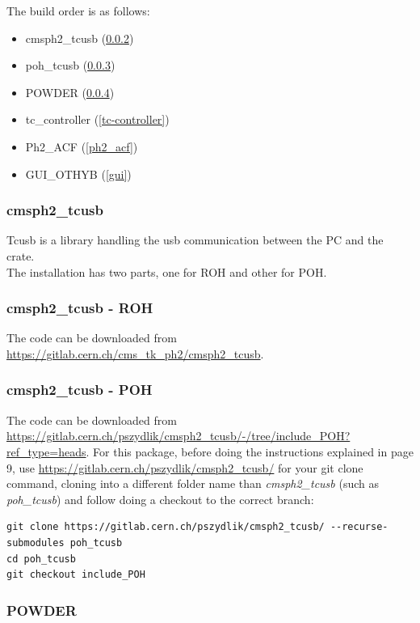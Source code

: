 \documentclass[10pt,a4paper]{article}
\begin{document}
The build order is as follows:
\begin{itemize}
    \item cmsph2\_tcusb (\ref{roh_tcusb})
    \item poh\_tcusb (\ref{poh_tcusb})
    \item POWDER (\ref{powder})
    \item tc\_controller (\ref{tc-controller})
    \item Ph2\_ACF (\ref{ph2_acf})
    \item GUI\_OTHYB (\ref{gui})
\end{itemize}

\subsubsection{cmsph2\_tcusb}

Tcusb is a library handling the usb communication between the PC and the crate.  \\
The installation has two parts, one for ROH and other for POH.

\subsubsection{cmsph2\_tcusb - ROH} 
\label{roh_tcusb}

The code can be downloaded from \url{https://gitlab.cern.ch/cms_tk_ph2/cmsph2_tcusb}.

\subsubsection{cmsph2\_tcusb - POH} 
\label{poh_tcusb}

The code can be downloaded from \url{https://gitlab.cern.ch/pszydlik/cmsph2_tcusb/-/tree/include_POH?ref_type=heads}. For this package, before doing the instructions explained in page 9, use \url{https://gitlab.cern.ch/pszydlik/cmsph2_tcusb/} for your git clone command, cloning into a different folder name than \emph{cmsph2\_tcusb} (such as \emph{poh\_tcusb}) and follow doing a checkout to the correct branch: 

\begin{framed}
\begin{verbatim}
git clone https://gitlab.cern.ch/pszydlik/cmsph2_tcusb/ --recurse-submodules poh_tcusb
cd poh_tcusb
git checkout include_POH
\end{verbatim}
\end{framed}

\subsubsection{POWDER}
\label{powder}
\end{document}
